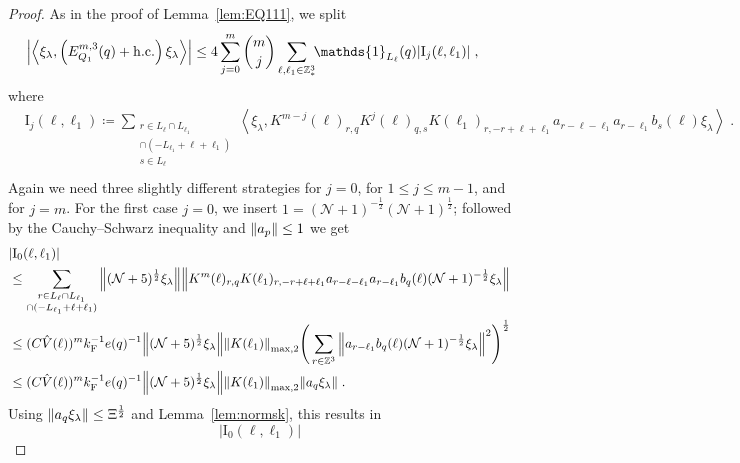 \documentclass[12pt,a4paper]{article}
\numberwithin{equation}{section}
\newcommand{\1}{\mathbb{I}}
\newcommand{\F}{\mathrm{F}}
\newcommand{\I}{\mathrm{I}}
\newcommand{\Z}{\mathbb{Z}}
\newcommand{\NN}{\mathcal{N}}
\newcommand{\half}{\frac{1}{2}}
\newcommand{\eva}[1]{\left\langle #1 \right\rangle}
\theoremstyle{plain}
\theoremstyle{definition}
\theoremstyle{remark}
\theoremstyle{plain}
\theoremstyle{definition}
\theoremstyle{remark}
\begin{document}
\begin{proof}
As in the proof of Lemma~\ref{lem:EQ111}, we split
\begin{equation} \label{eq:EQ1121}
\begin{aligned}
	& \abs{\eva{\xi_\lambda,\left(E^{m,3}_{Q_1}(q) + \mathrm{h.c.}\right) \xi_\lambda }}
	\le 4 \sum_{j=0}^m {{m}\choose j} \sum_{\ell,\ell_1 \in \Z^3_*}\!\! \mathds{1}_{L_\ell}(q) |\I_j(\ell, \ell_1)| \;,
	\end{aligned}
\end{equation}
where
\begin{equation}
\begin{aligned}
	& \I_j(\ell, \ell_1)
	\coloneq \sum_{\substack{r\in L_{\ell} \cap L_{\ell_1}\\ \cap (-L_{\ell_1}+\ell+\ell_1)\\ s \in L_{\ell}}}
		\eva{\xi_\lambda, K^{m-j}(\ell)_{r,q} K^{j}(\ell)_{q,s}K(\ell_1)_{r,-r+\ell+\ell_1} a_{r-\ell-\ell_1} a_{r-\ell_1} b_{s}(\ell) \xi_\lambda} \;. \\
\end{aligned}
\end{equation}
Again we need three slightly different strategies for $ j = 0 $, for $ 1 \le j \le m-1 $, and for $ j = m $. For the first case $ j = 0 $, we insert $1 = (\NN+1)^{-\half}(\NN+1)^{\half}$; followed by the Cauchy--Schwarz inequality and $ \norm{a_p} \le 1 $ we get
\begin{align}
	&|\I_0(\ell, \ell_1)| \nonumber\\
	&\leq \sum_{\substack{r\in L_{\ell} \cap L_{\ell_1}\\ \cap (-L_{\ell_1}+\ell+\ell_1)}} \norm{ (\NN+5)^{\half} \xi_\lambda} \norm{ K^m(\ell )_{r,q} K(\ell_1)_{r,-r+\ell+\ell_1} a_{r-\ell-\ell_1} a_{r-\ell_1} b_{q}(\ell) (\NN+1)^{-\half} \xi_\lambda }\nonumber\\
	 &\leq (C \hat{V}(\ell))^m k_{\F}^{-1} e(q)^{-1}
	 	\norm{ (\NN+5)^{\half} \xi_\lambda} \norm{K(\ell_1) }_{\max,2}
	 	\Bigg( \sum_{r\in \Z^3} \norm{ a_{r-\ell_1} b_{q}(\ell) (\NN+1)^{-\half} \xi_\lambda }^2 \Bigg)^\half \nonumber\\
	 &\leq (C \hat{V}(\ell))^m
	 	k_{\F}^{-1} e(q)^{-1}
	 	\norm{(\NN+5)^{\half} \xi_\lambda}
	 	\norm{K(\ell_1) }_{\max,2}
	 	\norm{ a_q \xi_\lambda } \;.
\end{align}
Using $ \norm{ a_q \xi_\lambda} \le \Xi^\half $ and Lemma~\ref{lem:normsk}, this results in
\begin{equation}
	|\I_0(\ell, \ell_1)|

\end{equation}
\end{proof}
\end{document}
